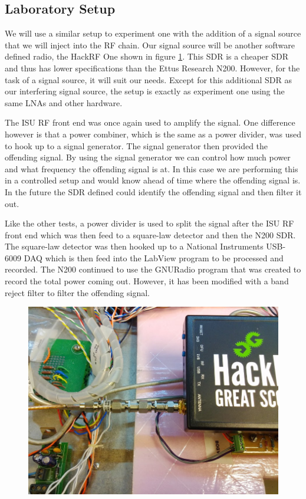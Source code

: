 \subsection{Laboratory Setup}
We will use a similar setup to experiment one with the addition of a signal source that we will inject into the RF chain.  Our signal source will be another software defined radio, the HackRF One shown in figure \ref{HackRF}.  This SDR is a cheaper SDR and thus has lower specifications than the Ettus Research N200.  However, for the task of a signal source, it will suit our needs.  Except for this additional SDR as our interfering signal source, the setup is exactly as experiment one using the same LNAs and other hardware.

The ISU RF front end was once again used to amplify the signal.  One difference however is that a power combiner, which is the same as a power divider, was used to hook up to a signal generator.  The signal generator then provided the offending signal.  By using the signal generator we can control how much power and what frequency the offending signal is at.  In this case we are performing this in a controlled setup and would know ahead of time where the offending signal is.  In the future the SDR defined could identify the offending signal and then filter it out.

Like the other tests, a power divider is used to split the signal after the ISU RF front end which was then feed to a square-law detector and then the N200 SDR.  The square-law detector was then hooked up to a National Instruments USB-6009 DAQ which is then feed into the LabView program to be processed and recorded.  The N200 continued to use the GNURadio program that was created to record the total power coming out.  However, it has been modified with a band reject filter to filter the offending signal.

\begin{figure}[h!tb] \centering

\includegraphics[width=\textwidth]{Images/Hack_RF.jpg}
\label{HackRF}
\end{figure} 

